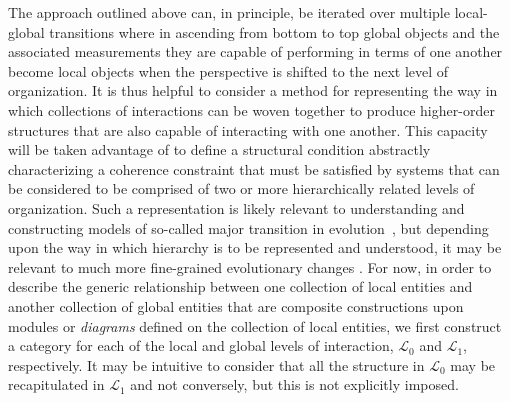 \documentclass[aps,twocolumn]{revtex4-1}
\begin{document}
The approach outlined above can, in principle, be iterated over multiple local-global transitions where in ascending from bottom to top global objects and the associated measurements they are capable of performing in terms of one another become local objects when the perspective is shifted to the next level of organization. It is thus helpful to consider a method for representing the way in which collections of interactions can be woven together to produce higher-order structures that are also capable of interacting with one another. This capacity will be taken advantage of to define a structural condition abstractly characterizing a coherence constraint that must be satisfied by systems that can be considered to be comprised of two or more hierarchically related levels of organization. Such a representation is likely relevant to understanding and constructing models of so-called major transition in evolution~\cite{MaynardSmith1995,Okasha2006,Calcott2011}, but depending upon the way in which hierarchy is to be represented and understood, it may be relevant to much more fine-grained evolutionary changes \cite{Ravasz2002,Guimera2005,Bhardwaj2010}. For now, in order to describe the generic relationship between one collection of local entities and another collection of global entities that are composite constructions upon modules or {\it diagrams} defined on the collection of local entities, we first construct a category for each of the local and global levels of interaction, $\mathcal{L}_0$ and $\mathcal{L}_1$, respectively. It may be intuitive to consider that all the structure in $\mathcal{L}_0$ may be recapitulated in $\mathcal{L}_1$ and not conversely, but this is not explicitly imposed.
\end{document}
